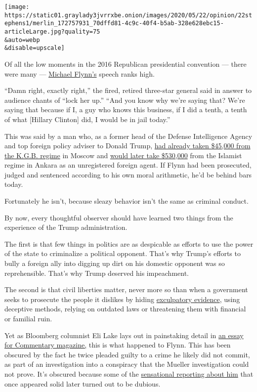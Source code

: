\texttt{[image: https://static01.graylady3jvrrxbe.onion/images/2020/05/22/opinion/22stephens1/merlin\_172757931\_70dffd81-4c9c-40f4-b5ab-328e628ebc15-articleLarge.jpg?quality=75\\\&auto=webp\\\&disable=upscale]}

Of all the low moments in the 2016 Republican presidential convention
--- there were many ---
\href{https://www.nytimes3xbfgragh.onion/2020/05/29/us/politics/flynn-russian-ambassador-transcripts.html}{Michael
Flynn's} speech ranks high.

``Damn right, exactly right,'' the fired, retired three-star general
said in answer to audience chants of ``lock her up.'' ``And you know why
we're saying that? We're saying that because if I, a guy who knows this
business, if I did a tenth, a tenth of what {[}Hillary Clinton{]} did, I
would be in jail today.''

This was said by a man who, as a former head of the Defense Intelligence
Agency and top foreign policy adviser to Donald Trump,
\href{https://www.nbcnews.com/news/us-news/russians-paid-mike-flynn-45k-moscow-speech-documents-show-n734506}{had
already taken \$45,000 from the K.G.B. regime} in Moscow and
\href{https://www.nytimes3xbfgragh.onion/2017/03/10/us/politics/michael-flynn-turkey.html?_r=0}{would
later take \$530,000} from the Islamist regime in Ankara as an
unregistered foreign agent. If Flynn had been prosecuted, judged and
sentenced according to his own moral arithmetic, he'd be behind bars
today.

Fortunately he isn't, because sleazy behavior isn't the same as criminal
conduct.

By now, every thoughtful observer should have learned two things from
the experience of the Trump administration.

The first is that few things in politics are as despicable as efforts to
use the power of the state to criminalize a political opponent. That's
why Trump's efforts to bully a foreign ally into digging up dirt on his
domestic opponent was so reprehensible. That's why Trump deserved his
impeachment.

The second is that civil liberties matter, never more so than when a
government seeks to prosecute the people it dislikes by hiding
\href{https://thehill.com/regulation/court-battles/494620-doj-gives-flynns-attorneys-documents-uncovered-in-review}{exculpatory
evidence}, using deceptive methods, relying on outdated laws or
threatening them with financial or familial ruin.

Yet as Bloomberg columnist Eli Lake lays out in painstaking detail in
\href{https://www.commentarymagazine.com/articles/eli-lake/michael-flynn-gets-railroaded-by-the-fbi/}{an
essay for Commentary magazine,} this is what happened to Flynn. This has
been obscured by the fact he twice pleaded guilty to a crime he likely
did not commit, as part of an investigation into a conspiracy that the
Mueller investigation could not prove. It's obscured because some of the
\href{https://www.theguardian.com/us-news/2017/mar/31/michael-flynn-new-evidence-spy-chiefs-had-concerns-about-russian-ties}{sensational
reporting about him} that once appeared solid later turned out to be
dubious.

